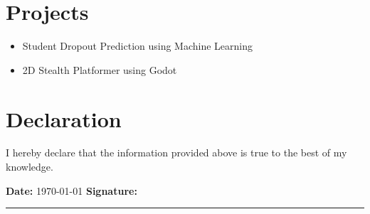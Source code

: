 \documentclass[a4paper,12pt]{article}
\begin{document}
\section*{Projects}
\begin{itemize}
    \item Student Dropout Prediction using Machine Learning
    \item 2D Stealth Platformer using Godot
\end{itemize}

\section*{Declaration}
I hereby declare that the information provided above is true to the best
of my knowledge.

\vspace{1cm}

\noindent
\textbf{Date:} \today \hfill
\textbf{Signature:} \rule{3cm}{0.4pt}
\end{document}
